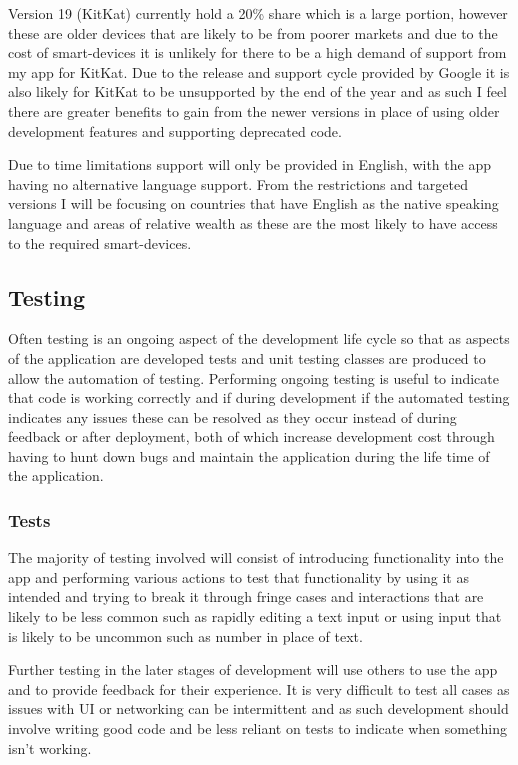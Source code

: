 Version 19 (KitKat) currently hold a 20\% share which is a large
portion, however these are older devices that are likely to be from
poorer markets and due to the cost of smart-devices it is unlikely for
there to be a high demand of support from my app for KitKat. Due to the
release and support cycle provided by Google it is also likely for
KitKat to be unsupported by the end of the year and as such I feel there
are greater benefits to gain from the newer versions in place of using
older development features and supporting deprecated code.

Due to time limitations support will only be provided in English, with
the app having no alternative language support. From the restrictions
and targeted versions I will be focusing on countries that have English
as the native speaking language and areas of relative wealth as these
are the most likely to have access to the required smart-devices.

\subsection{Testing}\label{testing}

Often testing is an ongoing aspect of the development life cycle so that
as aspects of the application are developed tests and unit testing
classes are produced to allow the automation of testing. Performing
ongoing testing is useful to indicate that code is working correctly and
if during development if the automated testing indicates any issues
these can be resolved as they occur instead of during feedback or after
deployment, both of which increase development cost through having to
hunt down bugs and maintain the application during the life time of the
application.

\subsubsection{Tests}\label{tests}

The majority of testing involved will consist of introducing
functionality into the app and performing various actions to test that
functionality by using it as intended and trying to break it through
fringe cases and interactions that are likely to be less common such as
rapidly editing a text input or using input that is likely to be
uncommon such as number in place of text.

Further testing in the later stages of development will use others to
use the app and to provide feedback for their experience. It is very
difficult to test all cases as issues with UI or networking can be
intermittent and as such development should involve writing good code
and be less reliant on tests to indicate when something isn't working.


